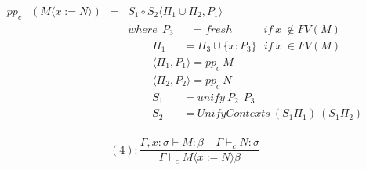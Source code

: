 \begin{equation*}
\begin{array}{llll}
pp_c & (M\langle x:=N\rangle) & = & S_1\circ S_2\langle \Pi _1\cup \Pi _2,P_1 \rangle\\
&&& where\ \ P_3 \ \ \ \ \ \ \ = fresh \ \ \ \ \ \ \ \ \ \ \ \ \ if\ x\ \not\in FV(M)\\
&&& \ \ \ \ \ \ \ \ \ \ \Pi _1 \ \ \ \ \ \ \ = \Pi _3 \cup \{x:P_3\}\ \ \ if\ x\ \in FV(M)\\
&&& \ \ \ \ \ \ \ \ \ \ \langle \Pi _1,P_1\rangle = pp_c\ M\\
&&& \ \ \ \ \ \ \ \ \ \ \langle \Pi _2,P_2\rangle = pp_c\ N\\
&&& \ \ \ \ \ \ \ \ \ \ S_1 \ \ \ \ \ \ \ \ = unify\ P_2\ \ P_3\\
&&& \ \ \ \ \ \ \ \ \ \ S_2 \ \ \ \ \ \ \ \ = UnifyContexts\ (S_1\Pi _1)\ (S_1\Pi _2)\\
\end{array}
\end{equation*}

\begin{equation*}
(4):\frac{\Gamma, {x:\sigma} \vdash M:\beta\ \ \ \ \ \Gamma \vdash _cN:\sigma}{\Gamma \vdash _cM\langle x:=N\rangle \beta} 
\end{equation*}



